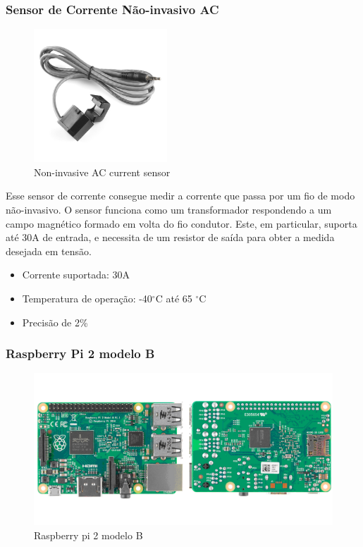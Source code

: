 \subsubsection{Sensor de Corrente Não-invasivo AC}
\begin{figure}[H]
\begin{center}
\includegraphics[width=5cm,height=5cm,keepaspectratio]{figuras/sensor.jpg}
\caption{\label{fig:sensor} Non-invasive AC current sensor}
\end{center}
\end{figure}

Esse sensor de corrente consegue medir a corrente que passa por um fio de modo não-invasivo. O sensor funciona como um transformador respondendo a um campo magnético formado em volta do fio condutor. Este, em particular, suporta até 30A de entrada, e necessita de um resistor de saída para obter a medida desejada em tensão.

\begin{itemize}
\item{Corrente suportada: 30A}
\item{Temperatura de operação: -40$^{\circ}$C até 65 $^{\circ}$C}
\item{Precisão de 2\%}
\end{itemize}
%
\subsubsection{Raspberry Pi 2 modelo B}
\begin{figure}[H]
\includegraphics[width=1\textwidth]{figuras/raspberry_pi.png}
\caption{\label{fig:raspberry pi} Raspberry pi 2 modelo B}
\end{figure}

